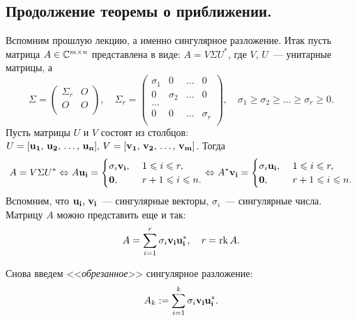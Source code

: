 \newpage
{}

\subsection{Продолжение теоремы о приближении.}

Вспомним прошлую лекцию, а именно сингулярное разложение.
Итак пусть матрица $A\in\mathbb{C}^{m\times n}$ представлена в виде: $A=V\Sigma U^*$, где $V,\, U$~--- унитарные матрицы, а
\[
    \Sigma = \left(
    \begin{array}{c|c}
            \Sigma_r & O \\
            \hline
            O        & O \\
        \end{array}
    \right),\quad
    \Sigma_r=
    \left(
    \begin{array}{cccc}
            \sigma_1 & 0        & \ldots & 0        \\
            0        & \sigma_2 & \ldots & 0        \\
            \ldots                                  \\
            0        & 0        & \ldots & \sigma_r \\
        \end{array}
    \right), \quad \sigma_1\geqslant \sigma_2\geqslant\ldots\geqslant\sigma_r\geqslant 0.
\]
Пусть матрицы $U$ и $V$ состоят из столбцов: $U=[\mathbf{u_1},\, \mathbf{u_2},\,\ldots,\, \mathbf{u_n}],\, V=[\mathbf{v_1},
            \,\mathbf{v_2},\,\ldots,\, \mathbf{v_m}]$.
Тогда
\[
    A=V\Sigma U^*\Leftrightarrow A\mathbf{u_i}=\begin{cases}
        \sigma_i\mathbf{v_i},\  & 1\leqslant i\leqslant r,   \\
        \mathbf{0},\            & r+1\leqslant i\leqslant n.
    \end{cases}\Leftrightarrow
    A^*\mathbf{v_i}=\begin{cases}
        \sigma_i\mathbf{u_i},\  & 1\leqslant i\leqslant r,   \\
        \mathbf{0},\            & r+1\leqslant i\leqslant n.
    \end{cases}
\]
Вспомним, что $\mathbf{u_i},\, \mathbf{v_i}$~--- сингулярные векторы, $\sigma_i$~--- сингулярные числа.
Матрицу $A$ можно представить еще и так:
\[
    A=\sum_{i=1}^r \sigma_i\mathbf{v_i}\mathbf{u_i^*}, \quad r = \operatorname{rk} A.
\]

Снова введем <<\textit{обрезанное}>> сингулярное разложение:
\[
    A_k:=\sum_{i=1}^k\sigma_i\mathbf{v_i}\mathbf{u_i^*}.
\]

